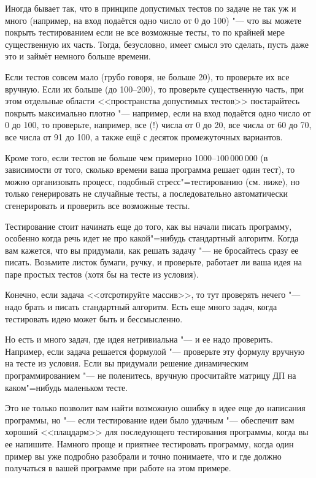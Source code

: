 \documentclass[a4paper,10pt]{problems}
\begin{document}
Иногда бывает так, что в принципе допустимых тестов по задаче не так уж и много (например, на вход подаётся одно число от 0 до 100)
"--- что вы можете покрыть тестированием если не все возможные тесты, то по крайней мере существенную их часть.
Тогда, безусловно, имеет смысл это сделать, пусть даже это и займёт немного больше времени. 

Если тестов совсем мало (грубо говоря, не больше 20), то проверьте их все вручную. 
Если их больше (до 100--200), то проверьте существенную часть, при этом отдельные области <<пространства допустимых тестов>> постарайтесь покрыть
максимально плотно "--- например, если на вход подаётся одно число от 0 до 100, то проверьте, например, все (!) числа от 0 до 20, 
все числа от 60 до 70, все числа от 91 до 100, а также ещё с десяток промежуточных вариантов.

Кроме того, если тестов не больше чем примерно 1000--$100\,000\,000$ (в зависимости от того, сколько времени ваша программа решает один тест),
то можно организовать процесс, подобный стресс"=тестированию (см. ниже), но только генерировать не случайные тесты, 
а последовательно автоматически сгенерировать и проверить все возможные тесты.


 Тестирование стоит начинать еще до того, как вы начали писать программу, 
особенно когда речь идет не про какой"=нибудь стандартный алгоритм. 
Когда вам кажется, что вы придумали, как решать задачу "--- не бросайтесь сразу ее писать. 
Возьмите листок бумаги, ручку, и проверьте, работает ли ваша идея на паре простых тестов (хотя бы на тесте из условия).

Конечно, если задача <<отсротируйте массив>>, то тут проверять нечего "--- надо брать и писать стандартный алгоритм.
Есть еще много задач, когда тестировать идею может быть и бессмысленно.

Но есть и много задач, где идея нетривиальна "--- и ее надо проверить. 
Например, если задача решается формулой "--- проверьте эту формулу вручную на тесте из условия.
Если вы придумали решение динамическим программированием "--- не поленитесь, вручную просчитайте матрицу ДП
на каком"=нибудь маленьком тесте.

Это не только позволит вам найти возможную ошибку в идее еще до написания программы, но "--- если тестирование идеи было удачным
"--- обеспечит вам хороший <<плацдарм>> для последующего тестирования программы, когда вы ее напишите.
Намного проще и приятнее тестировать программу, когда один пример вы уже подробно разобрали и точно понимаете, что 
и где должно получаться в вашей программе при работе на этом примере.
\end{document}
